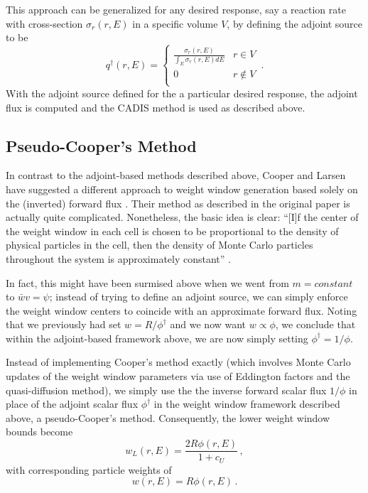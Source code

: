 This approach can be generalized for any desired response, say a reaction rate
with cross-section $\sigma_r(r,E)$ in a specific volume $V$, by defining the
adjoint source to be
\begin{equation}
q^\dag(r,E) = 
\begin{cases} \frac{\sigma_r(r,E)}{ \int_E \sigma_r(r,E) dE} &  r\in V \\
              0 &  r \notin V \\
\end{cases} \, .
\end{equation}
With the adjoint source defined for the a particular desired response, the
adjoint flux is computed and the CADIS method is used as described above.

\subsection{Pseudo-Cooper's Method}
In contrast to the adjoint-based methods described above, Cooper and Larsen have
suggested a different approach to weight window generation based solely on the
(inverted) forward flux \cite{cooper2001aww}.  Their method as described in the
original paper is actually quite complicated. Nonetheless, the basic idea is
clear: ``[I]f the center of the weight window in each cell is chosen to be
proportional to the density of physical particles in the cell, then the density
of Monte Carlo particles throughout the system is approximately constant''
\cite{cooper2001aww}.  

In fact, this might have been surmised above when we went from $m = constant$ to
$\bar{w}v=\psi$; instead of trying to define an adjoint source, we can simply
enforce the weight window centers to coincide with an approximate forward flux. 
 Noting that we previously had set $w = R/\phi^\dag$ and we now want $w \propto
\phi$, we conclude that within the adjoint-based framework above, we are now
simply setting $\phi^\dag = 1/\phi$.

Instead of implementing Cooper's method exactly (which involves Monte Carlo
updates of the weight window parameters via use of Eddington factors and the
quasi-diffusion method), we simply use the the inverse forward scalar flux
$1/\phi$ in place of the adjoint scalar flux $\phi^\dag$ in the weight window
framework described above, \ie a pseudo-Cooper's method.  Consequently, the
lower weight window bounds become
\begin{equation}
 w_L(r,E) = \frac{2R\phi(r,E)}{1+c_U} \, ,
\end{equation}
with corresponding particle weights of
\begin{equation}
 w(r,E) = R\phi(r,E) \, .
\end{equation}

